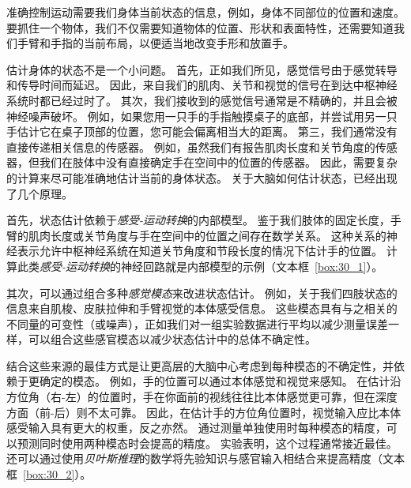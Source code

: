 准确控制运动需要我们身体当前状态的信息，例如，身体不同部位的位置和速度。
要抓住一个物体，我们不仅需要知道物体的位置、形状和表面特性，还需要知道我们手臂和手指的当前布局，以便适当地改变手形和放置手。


估计身体的状态不是一个小问题。
首先，正如我们所见，感觉信号由于感觉转导和传导时间而延迟。
因此，来自我们的肌肉、关节和视觉的信号在到达中枢神经系统时都已经过时了。
其次，我们接收到的感觉信号通常是不精确的，并且会被神经噪声破坏。
例如，如果您用一只手的手指触摸桌子的底部，并尝试用另一只手估计它在桌子顶部的位置，您可能会偏离相当大的距离。
第三，我们通常没有直接传递相关信息的传感器。
例如，虽然我们有报告肌肉长度和关节角度的传感器，但我们在肢体中没有直接确定手在空间中的位置的传感器。
因此，需要复杂的计算来尽可能准确地估计当前的身体状态。
关于大脑如何估计状态，已经出现了几个原理。


首先，状态估计依赖于\textit{感受-运动转换}的内部模型。
鉴于我们肢体的固定长度，手臂的肌肉长度或关节角度与手在空间中的位置之间存在数学关系。
这种关系的神经表示允许中枢神经系统在知道关节角度和节段长度的情况下估计手的位置。
计算此类\textit{感受-运动转换}的神经回路就是内部模型的示例（文本框~\ref{box:30_1}）。


其次，可以通过组合多种\textit{感觉模态}来改进状态估计。
例如，关于我们四肢状态的信息来自肌梭、皮肤拉伸和手臂视觉的本体感受信息。
这些模态具有与之相关的不同量的可变性（或噪声），正如我们对一组实验数据进行平均以减少测量误差一样，可以组合这些感官模态以减少状态估计中的总体不确定性。


结合这些来源的最佳方式是让更高层的大脑中心考虑到每种模态的不确定性，并依赖于更确定的模态。
例如，手的位置可以通过本体感觉和视觉来感知。
在估计沿方位角（右-左）的位置时，手在你面前的视线往往比本体感觉更可靠，但在深度方面（前-后）则不太可靠。
因此，在估计手的方位角位置时，视觉输入应比本体感受输入具有更大的权重，反之亦然。
通过测量单独使用时每种模态的精度，可以预测同时使用两种模态时会提高的精度。
实验表明，这个过程通常接近最佳。
还可以通过使用\textit{贝叶斯推理}的数学将先验知识与感官输入相结合来提高精度（文本框~\ref{box:30_2}）。


